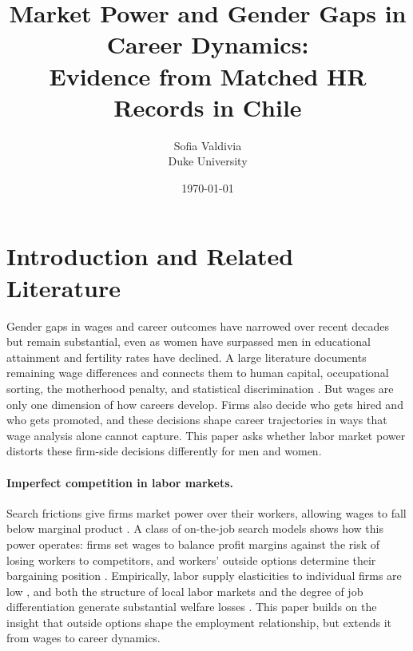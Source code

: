 \documentclass[11pt]{article}
\title{Market Power and Gender Gaps in Career Dynamics: \\ Evidence from Matched HR Records in Chile}
\author{Sofia Valdivia \\ Duke University}
\date{\today}
\begin{document}
\maketitle


\section{Introduction and Related Literature}

Gender gaps in wages and career outcomes have narrowed over recent decades but remain substantial, even as women have surpassed men in educational attainment and fertility rates have declined. A large literature documents remaining wage differences and connects them to human capital, occupational sorting, the motherhood penalty, and statistical discrimination \citep{goldin_grand_2014, blau_gender_2017, kleven_children_2019, Xiao}. But wages are only one dimension of how careers develop. Firms also decide who gets hired and who gets promoted, and these decisions shape career trajectories in ways that wage analysis alone cannot capture. This paper asks whether labor market power distorts these firm-side decisions differently for men and women.

\paragraph{Imperfect competition in labor markets.}
Search frictions give firms market power over their workers, allowing wages to fall below marginal product \citep{manning_monopsony_2003, manning_imperfect_2011}. A class of on-the-job search models shows how this power operates: firms set wages to balance profit margins against the risk of losing workers to competitors, and workers' outside options determine their bargaining position \citep{burdett_wage_1998, postel-vinay_equilibrium_2002}. Empirically, labor supply elasticities to individual firms are low \citep{sokolova_monopsony_2021}, and both the structure of local labor markets and the degree of job differentiation generate substantial welfare losses \citep{berger_labor_2022, Jarosch_Nimczik_Sorkin_2024}. This paper builds on the insight that outside options shape the employment relationship, but extends it from wages to career dynamics.
\end{document}
